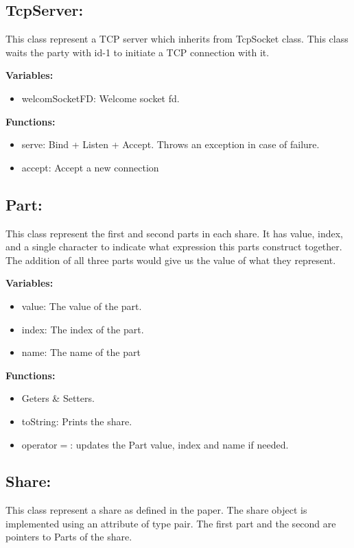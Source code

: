 \documentclass[12pt]{article}
\begin{document}
\subsection{TcpServer:}
This class represent a TCP server which inherits from TcpSocket class. This class waits the party with id-1 to initiate a TCP connection with it.\hfill\break

\textbf{Variables:}
\begin{itemize}
\item welcomSocketFD: Welcome socket fd.
\end{itemize}
\textbf{Functions:}
\begin{itemize}
	\item serve: Bind + Listen + Accept. Throws an exception in case of failure.
	
	\item accept: Accept a new connection
\end{itemize}

\subsection{Part:}
This class represent the first and second parts in each share. It has value, index, and a single character to indicate what expression this parts construct together.
The addition of all three parts would give us the value of what they represent.\hfill\break

\textbf{Variables:}
\begin{itemize}
\item value: The value of the part.
\item index: The index of the part.
\item name: The name of the part
\end{itemize}

\textbf{Functions:}
\begin{itemize}
\item Geters \& Setters.
\item toString: Prints the share.
\item operator$=$: updates the Part value, index and name if needed.
\end{itemize}
\subsection{Share:}
This class represent a share as defined in the paper. The share object is implemented using an attribute of type pair. The first part and the second are pointers to Parts of the share.\hfill\break
\end{document}

